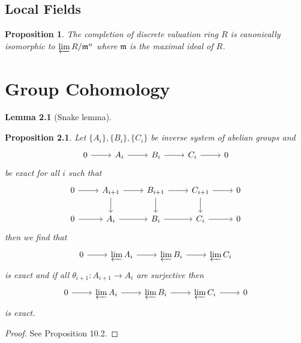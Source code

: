 \documentclass[twoside, 12pt]{iiser-thesis}
\newtheorem{prop}[thm]{ Proposition}
\newtheorem{lem}[thm]{ Lemma}
\begin{document}
\section{Local Fields}
\begin{prop}
The completion of discrete valuation ring $R$ is canonically isomorphic to $\varprojlim R/ \mathfrak m ^n$ where $\mathfrak m$ is the maximal ideal of $R$.
\end{prop}
\chapter{Group Cohomology}
\begin{lem}[Snake lemma]
\end{lem}
\begin{prop}\label{inverselimitexact}
Let $\{A_i\},\{B_i\}, \{C_i\}$ be inverse system of abelian groups and \[ \begin{tikzcd}
0 \arrow[r] & A_i \arrow[r] & B_i \arrow[r] & C_i \arrow[r] & 0 
\end{tikzcd}\] be exact for all $i$ such that 
\[ \begin{tikzcd}
 0 \arrow [r] & A_{i+1} \arrow[r] \arrow[d] & B_{i+1} \arrow[d] \arrow[r] & C_{i+1} \arrow[r] \arrow[d] & 0 \\
0 \arrow[r] & A_i \arrow[r] & B_i \arrow[r] & C_i \arrow[r] & 0
\end{tikzcd} \] then we find that 
\[ \begin{tikzcd}
0 \arrow[r] & \varprojlim A_i \arrow[r] & \varprojlim B_i \arrow[r] & \varprojlim C_i 
\end{tikzcd}\]
is exact and if all $\theta_{i+1}:A_{i+1}\rightarrow A_i$ are surjective then \[ \begin{tikzcd}
0 \arrow[r] & \varprojlim A_i \arrow[r] & \varprojlim B_i \arrow[r] & \varprojlim C_i \arrow[r] & 0
\end{tikzcd}\] is exact.
\end{prop}
\begin{proof}
See \cite{atiyah} Proposition 10.2.
\end{proof}
\end{document}
